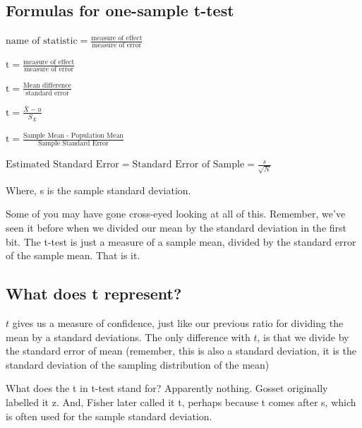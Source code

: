 \documentclass[
  letterpaper,
  DIV=11,
  numbers=noendperiod]{scrreprt}
\begin{document}
\subsection{Formulas for one-sample
t-test}\label{formulas-for-one-sample-t-test}

\(\text{name of statistic} = \frac{\text{measure of effect}}{\text{measure of error}}\)

\(\text{t} = \frac{\text{measure of effect}}{\text{measure of error}}\)

\(\text{t} = \frac{\text{Mean difference}}{\text{standard error}}\)

\(\text{t} = \frac{\bar{X}-u}{S_{\bar{X}}}\)

\(\text{t} = \frac{\text{Sample Mean  - Population Mean}}{\text{Sample Standard Error}}\)

\(\text{Estimated Standard Error} = \text{Standard Error of Sample} = \frac{s}{\sqrt{N}}\)

Where, s is the sample standard deviation.

Some of you may have gone cross-eyed looking at all of this. Remember,
we've seen it before when we divided our mean by the standard deviation
in the first bit. The t-test is just a measure of a sample mean, divided
by the standard error of the sample mean. That is it.

\subsection{What does t represent?}\label{what-does-t-represent}

\(t\) gives us a measure of confidence, just like our previous ratio for
dividing the mean by a standard deviations. The only difference with
\(t\), is that we divide by the standard error of mean (remember, this
is also a standard deviation, it is the standard deviation of the
sampling distribution of the mean)

\begin{tcolorbox}[enhanced jigsaw, title=\textcolor{quarto-callout-note-color}{\faInfo}\hspace{0.5em}{Note}, colframe=quarto-callout-note-color-frame, colbacktitle=quarto-callout-note-color!10!white, bottomtitle=1mm, leftrule=.75mm, rightrule=.15mm, titlerule=0mm, arc=.35mm, colback=white, opacitybacktitle=0.6, toprule=.15mm, toptitle=1mm, bottomrule=.15mm, coltitle=black, breakable, left=2mm, opacityback=0]

What does the t in t-test stand for? Apparently nothing. Gosset
originally labelled it z. And, Fisher later called it t, perhaps because
t comes after s, which is often used for the sample standard deviation.

\end{tcolorbox}
\end{document}
